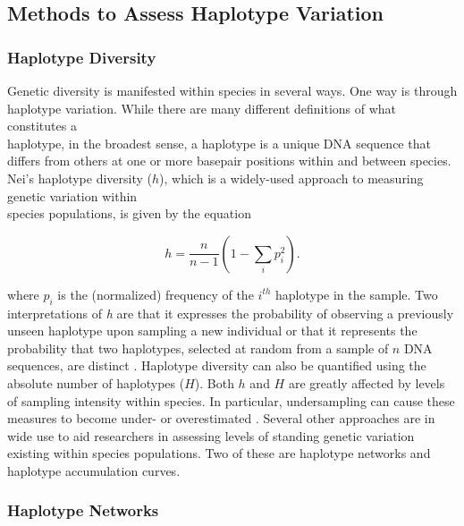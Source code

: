 \subsection{Methods to Assess Haplotype Variation}

\subsubsection{Haplotype Diversity}

Genetic diversity is manifested within species in several ways. One way is through haplotype variation. While there are many different definitions of what constitutes a \\ haplotype, in the broadest sense, a haplotype is a unique DNA sequence that differs from others at one or more basepair positions within and between species. Nei's \cite{nei1987molecular} haplotype diversity ($h$), which is a widely-used approach to measuring genetic variation within \\ species populations, is given by the equation 

\begin{equation}
h = \frac{n}{n-1}\left(1 - \sum_i{p_i^2}\right).
\end{equation}

\vspace{5mm}

\noindent where $p_i$ is the (normalized) frequency of the $i^{th}$ haplotype in the sample. Two \\ interpretations of \textit{h} are that it expresses the probability of observing a previously unseen haplotype upon sampling a new individual \cite{wares2015can} or that it represents the probability that two haplotypes, selected at random from a sample of $n$ DNA sequences, are distinct \cite{goodall2012comparison}. Haplotype diversity can also be quantified using the absolute number of haplotypes ($H$). Both $h$ and $H$ are greatly affected by levels of sampling intensity within species. In particular, undersampling can cause these measures to become under- or overestimated \cite{goodall2012comparison}. Several other approaches are in wide use to aid researchers in assessing levels of standing genetic variation existing within species populations. Two of these are haplotype networks and haplotype accumulation curves. 

\vspace{5mm}

\subsubsection{Haplotype Networks} 

